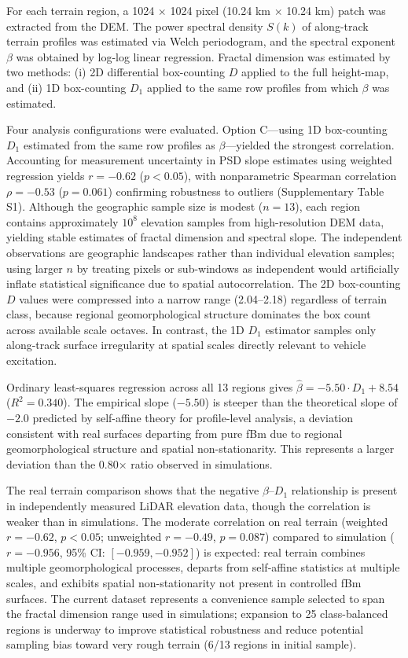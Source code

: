 \documentclass[11pt]{article}
\begin{document}
For each terrain region, a 1024 $\times$ 1024 pixel (10.24 km $\times$ 10.24 km) patch was extracted from the DEM. The power spectral density $S(k)$ of along-track terrain profiles was estimated via Welch periodogram, and the spectral exponent $\beta$ was obtained by log-log linear regression. Fractal dimension was estimated by two methods: (i) 2D differential box-counting $D$ applied to the full height-map, and (ii) 1D box-counting $D_1$ applied to the same row profiles from which $\beta$ was estimated.

Four analysis configurations were evaluated. Option C---using 1D box-counting $D_1$ estimated from the same row profiles as $\beta$---yielded the strongest correlation. Accounting for measurement uncertainty in PSD slope estimates using weighted regression yields $r = -0.62$ ($p < 0.05$), with nonparametric Spearman correlation $\rho = -0.53$ ($p = 0.061$) confirming robustness to outliers (Supplementary Table S1). Although the geographic sample size is modest ($n=13$), each region contains approximately $10^8$ elevation samples from high-resolution DEM data, yielding stable estimates of fractal dimension and spectral slope. The independent observations are geographic landscapes rather than individual elevation samples; using larger $n$ by treating pixels or sub-windows as independent would artificially inflate statistical significance due to spatial autocorrelation. The 2D box-counting $D$ values were compressed into a narrow range (2.04--2.18) regardless of terrain class, because regional geomorphological structure dominates the box count across available scale octaves. In contrast, the 1D $D_1$ estimator samples only along-track surface irregularity at spatial scales directly relevant to vehicle excitation.

Ordinary least-squares regression across all 13 regions gives $\hat{\beta} = -5.50 \cdot D_1 + 8.54$ ($R^2 = 0.340$). The empirical slope ($-5.50$) is steeper than the theoretical slope of $-2.0$ predicted by self-affine theory for profile-level analysis, a deviation consistent with real surfaces departing from pure fBm due to regional geomorphological structure and spatial non-stationarity. This represents a larger deviation than the 0.80× ratio observed in simulations.

The real terrain comparison shows that the negative $\beta$--$D_1$ relationship is present in independently measured LiDAR elevation data, though the correlation is weaker than in simulations. The moderate correlation on real terrain (weighted $r = -0.62$, $p < 0.05$; unweighted $r = -0.49$, $p = 0.087$) compared to simulation ($r = -0.956$, 95\% CI: $[-0.959, -0.952]$) is expected: real terrain combines multiple geomorphological processes, departs from self-affine statistics at multiple scales, and exhibits spatial non-stationarity not present in controlled fBm surfaces. The current dataset represents a convenience sample selected to span the fractal dimension range used in simulations; expansion to 25 class-balanced regions is underway to improve statistical robustness and reduce potential sampling bias toward very rough terrain (6/13 regions in initial sample).
\end{document}
